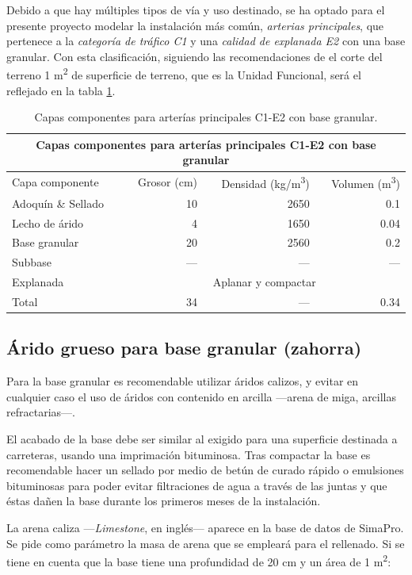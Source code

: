 Debido a que hay múltiples tipos de vía y uso destinado, se ha optado para el presente proyecto modelar la instalación más común, \textit{arterias principales}, que pertenece a la \textit{categoría de tráfico C1} y una \textit{calidad de explanada E2} con una base granular. Con esta clasificación, siguiendo las recomendaciones de \cite{euroadoquinc} el corte del terreno 1 \si{m^2} de superficie de terreno, que es la Unidad Funcional, será el reflejado en la tabla \ref{cortedelterreno}.

\begin{table}[!htb]
\centering
\begin{tabular}{lrrr}
\toprule
\multicolumn{4}{c}{Capas componentes para arterías principales C1-E2 con base granular}\\
\midrule
Capa componente & Grosor (\si{cm}) & Densidad (\si{kg/m^3}) & Volumen (\si{m^3})\\
\midrule
Adoquín \& Sellado & 10 & 2650 & 0.1\\
Lecho de árido & 4 & 1650 & 0.04\\
Base granular & 20 & 2560 & 0.2\\
Subbase & — & — & —\\
Explanada & \multicolumn{3}{c}{Aplanar y compactar}\\
\midrule
Total & 34 & — & 0.34\\
\bottomrule
\end{tabular}
\caption{Capas componentes para arterías principales C1-E2 con base granular.}
\label{cortedelterreno}
\end{table}

\subsection{Árido grueso para base granular (zahorra)}

Para la base granular es recomendable utilizar áridos calizos, y evitar en cualquier caso el uso de áridos con contenido en arcilla —arena de miga, arcillas refractarias—.

El acabado de la base debe ser similar al exigido para una superficie destinada a carreteras, usando una imprimación bituminosa. Tras compactar la base es recomendable hacer un sellado por medio de betún de curado rápido o emulsiones bituminosas para poder evitar filtraciones de agua a través de las juntas y que éstas dañen la base durante los primeros meses de la instalación.

La arena caliza —\textit{Limestone}, en inglés— aparece en la base de datos de SimaPro. Se pide como parámetro la masa de arena que se empleará para el rellenado. Si se tiene en cuenta que la base tiene una profundidad de 20 \si{cm} y un área de 1 \si{m^2}:

